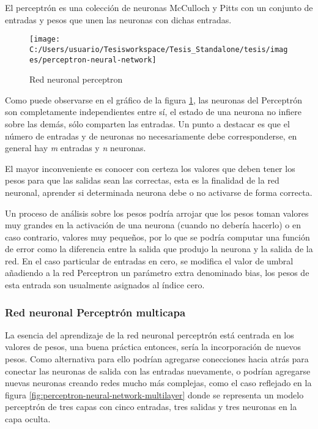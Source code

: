 El perceptrón es una colección de neuronas McCulloch y Pitts con un
conjunto de entradas y pesos que unen las neuronas con dichas entradas. 

\begin{figure}
\begin{centering}
\texttt{[image: C:/Users/usuario/Tesisworkspace/Tesis\_Standalone/tesis/images/perceptron-neural-network]}
\par\end{centering}

\caption{Red neuronal perceptron\label{fig:perceptron-neural-network}}
\end{figure}


Como puede observarse en el gráfico de la figura \ref{fig:perceptron-neural-network},
las neuronas del Perceptrón son completamente independientes entre
sí, el estado de una neurona no infiere sobre las demás, sólo comparten
las entradas. Un punto a destacar es que el número de entradas y de
neuronas no necesariamente debe corresponderse, en general hay \emph{m}
entradas y \emph{n} neuronas. 

El mayor inconveniente es conocer con certeza los valores que deben
tener los pesos para que las salidas sean las correctas, esta es la
finalidad de la red neuronal, aprender si determinada neurona debe
o no activarse de forma correcta. 

Un proceso de análisis sobre los pesos podría arrojar que los pesos
toman valores muy grandes en la activación de una neurona (cuando
no debería hacerlo) o en caso contrario, valores muy pequeños, por
lo que se podría computar una función de error como la diferencia
entre la salida que produjo la neurona y la salida de la red. En el
caso particular de entradas en cero, se modifica el valor de umbral
añadiendo a la red Perceptron un parámetro extra denominado bias,
los pesos de esta entrada son usualmente asignados al índice cero. 


\subsubsection*{Red neuronal Perceptrón multicapa }

La esencia del aprendizaje de la red neuronal perceptrón está centrada
en los valores de pesos, una buena práctica entonces, sería la incorporación
de nuevos pesos. Como alternativa para ello podrían agregarse conecciones
hacia atrás para conectar las neuronas de salida con las entradas
nuevamente, o podrían agregarse nuevas neuronas creando redes mucho
más complejas, como el caso reflejado en la figura \ref{fig:perceptron-neural-network-multilayer}
donde se representa un modelo perceptrón de tres capas con cinco entradas,
tres salidas y tres neuronas en la capa oculta.

